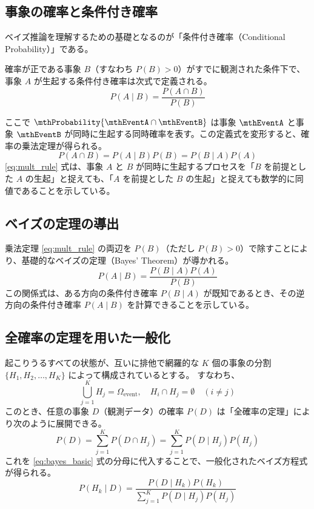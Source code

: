 \subsection{事象の確率と条件付き確率}
ベイズ推論を理解するための基礎となるのが「条件付き確率（Conditional Probability）」である。

確率が正である事象 $B$（すなわち $P(B) > 0$）がすでに観測された条件下で、事象 $A$ が生起する条件付き確率は次式で定義される。
\begin{equation}
P(A \mid B) = \frac{P(A \cap B)}{P(B)}
\label{eq:cond_prob}
\end{equation}

ここで $\mthProbability{\mthEventA \cap \mthEventB}$ は事象 $\mthEventA$ と事象 $\mthEventB$ が同時に生起する同時確率を表す。この定義式を変形すると、確率の乗法定理が得られる。
\begin{equation}
P(A \cap B) = P(A \mid B) P(B) = P(B \mid A) P(A)
\label{eq:mult_rule}
\end{equation}
\eqref{eq:mult_rule} 式は、事象 $A$ と $B$ が同時に生起するプロセスを「$B$ を前提とした $A$ の生起」と捉えても、「$A$ を前提とした $B$ の生起」と捉えても数学的に同値であることを示している。

\subsection{ベイズの定理の導出}
乗法定理 \eqref{eq:mult_rule} の両辺を $P(B)$（ただし $P(B) > 0$）で除すことにより、基礎的なベイズの定理（Bayes' Theorem）が導かれる。
\begin{equation}
P(A \mid B) = \frac{P(B \mid A) P(A)}{P(B)}
\label{eq:bayes_basic}
\end{equation}
この関係式は、ある方向の条件付き確率 $P(B \mid A)$ が既知であるとき、その逆方向の条件付き確率 $P(A \mid B)$ を計算できることを示している。

\subsection{全確率の定理を用いた一般化}
起こりうるすべての状態が、互いに排他で網羅的な $K$ 個の事象の分割 $\{H_1, H_2, \dots, H_K\}$ によって構成されているとする。
すなわち、
\begin{equation}
    \bigcup_{j=1}^K H_j = \Omega_{\mathrm{event}}, \quad H_i \cap H_j = \emptyset \quad (i \neq j)
\end{equation}
このとき、任意の事象 $D$（観測データ）の確率 $P(D)$ は「全確率の定理」により次のように展開できる。
\begin{equation}
P(D) = \sum_{j=1}^K P(D \cap H_j) = \sum_{j=1}^K P(D \mid H_j) P(H_j)
\label{eq:law_of_total_prob}
\end{equation}
これを \eqref{eq:bayes_basic} 式の分母に代入することで、一般化されたベイズ方程式が得られる。
\begin{equation}
P(H_k \mid D) = \frac{P(D \mid H_k) P(H_k)}{\displaystyle\sum_{j=1}^K P(D \mid H_j) P(H_j)}
\label{eq:gen_bayes}
\end{equation}

